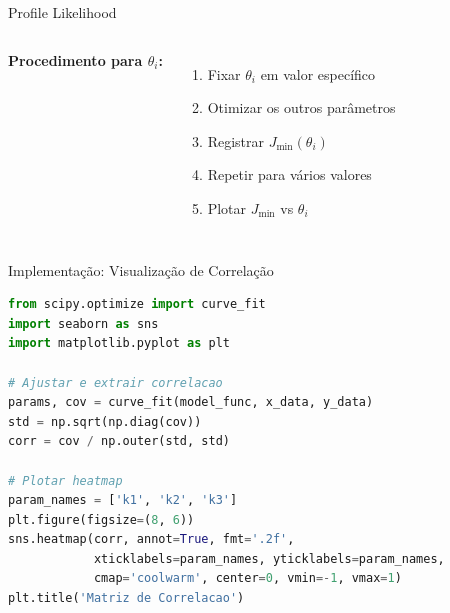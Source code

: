 \begin{frame}{Profile Likelihood}

\begin{columns}
\textbf{Procedimento para $\theta_i$:}
\begin{enumerate}\small
    \item Fixar $\theta_i$ em valor específico
    \item Otimizar os outros parâmetros
    \item Registrar $J_{\min}(\theta_i)$
    \item Repetir para vários valores
    \item Plotar $J_{\min}$ vs $\theta_i$
\end{enumerate}

\begin{center}
\end{center}
\end{columns}
\end{frame}

\begin{frame}[fragile]{Implementação: Visualização de Correlação}
\begin{lstlisting}[language=Python, caption=Heatmap de correlacao usando seaborn, basicstyle=\ttfamily\scriptsize]
from scipy.optimize import curve_fit
import seaborn as sns
import matplotlib.pyplot as plt

# Ajustar e extrair correlacao
params, cov = curve_fit(model_func, x_data, y_data)
std = np.sqrt(np.diag(cov))
corr = cov / np.outer(std, std)

# Plotar heatmap
param_names = ['k1', 'k2', 'k3']
plt.figure(figsize=(8, 6))
sns.heatmap(corr, annot=True, fmt='.2f',
            xticklabels=param_names, yticklabels=param_names,
            cmap='coolwarm', center=0, vmin=-1, vmax=1)
plt.title('Matriz de Correlacao')
\end{lstlisting}
\end{frame}

